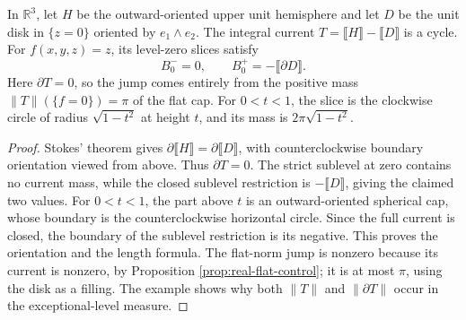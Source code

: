 \begin{example}\label{ex:closed-current-flat-cap-jump}
In $\mathbb R^3$, let $H$ be the outward-oriented upper unit hemisphere and let $D$ be the unit disk in $\{z=0\}$ oriented by $e_1\wedge e_2$. The integral current $T=\llbracket H\rrbracket-\llbracket D\rrbracket$ is a cycle. For $f(x,y,z)=z$, its level-zero slices satisfy
\[
 B_0^-=0,\qquad B_0^+=-\llbracket\partial D\rrbracket.
\]
Here $\partial T=0$, so the jump comes entirely from the positive mass $\|T\|(\{f=0\})=\pi$ of the flat cap. For $0<t<1$, the slice is the clockwise circle of radius $\sqrt{1-t^2}$ at height $t$, and its mass is $2\pi\sqrt{1-t^2}$.
\end{example}
\begin{proof}
Stokes' theorem gives $\partial\llbracket H\rrbracket=\partial\llbracket D\rrbracket$, with counterclockwise boundary orientation viewed from above. Thus $\partial T=0$. The strict sublevel at zero contains no current mass, while the closed sublevel restriction is $-\llbracket D\rrbracket$, giving the claimed two values. For $0<t<1$, the part above $t$ is an outward-oriented spherical cap, whose boundary is the counterclockwise horizontal circle. Since the full current is closed, the boundary of the sublevel restriction is its negative. This proves the orientation and the length formula. The flat-norm jump is nonzero because its current is nonzero, by Proposition \ref{prop:real-flat-control}; it is at most $\pi$, using the disk as a filling. The example shows why both $\|T\|$ and $\|\partial T\|$ occur in the exceptional-level measure.
\end{proof}

